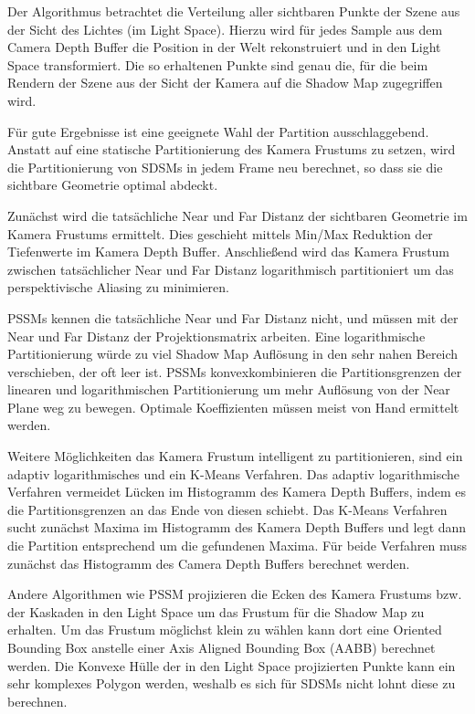 \documentclass[runningheaders,a4paper]{llncs}
\begin{document}
Der Algorithmus betrachtet die Verteilung aller sichtbaren Punkte der Szene aus der Sicht des Lichtes (im Light Space).
Hierzu wird für jedes Sample aus dem Camera Depth Buffer die Position in der Welt rekonstruiert und in den Light Space transformiert.
Die so erhaltenen Punkte sind genau die, für die beim Rendern der Szene aus der Sicht der Kamera auf die Shadow Map zugegriffen wird.


Für gute Ergebnisse ist eine geeignete Wahl der Partition ausschlaggebend.
Anstatt auf eine statische Partitionierung des Kamera Frustums \cite{pssm} zu setzen, wird die Partitionierung von SDSMs in jedem Frame neu berechnet, so dass sie die sichtbare Geometrie optimal abdeckt.

Zunächst wird die tatsächliche Near und Far Distanz der sichtbaren Geometrie im Kamera Frustums ermittelt.
Dies geschieht mittels Min/Max Reduktion der Tiefenwerte im Kamera Depth Buffer.
Anschließend wird das Kamera Frustum zwischen tatsächlicher Near und Far Distanz logarithmisch partitioniert um das perspektivische Aliasing zu minimieren.

PSSMs kennen die tatsächliche Near und Far Distanz nicht, und müssen mit der Near und Far Distanz der Projektionsmatrix arbeiten.
Eine logarithmische Partitionierung würde zu viel Shadow Map Auflösung in den sehr nahen Bereich verschieben, der oft leer ist.
PSSMs konvexkombinieren die Partitionsgrenzen der linearen und logarithmischen Partitionierung um mehr Auflösung von der Near Plane weg zu bewegen.
Optimale Koeffizienten müssen meist von Hand ermittelt werden.

Weitere Möglichkeiten das Kamera Frustum intelligent zu partitionieren, sind ein adaptiv logarithmisches und ein K-Means Verfahren.
Das adaptiv logarithmische Verfahren vermeidet Lücken im Histogramm des Kamera Depth Buffers, indem es die Partitionsgrenzen an das Ende von diesen schiebt.
Das K-Means Verfahren sucht zunächst Maxima im Histogramm des Kamera Depth Buffers und legt dann die Partition entsprechend um die gefundenen Maxima.
Für beide Verfahren muss zunächst das Histogramm des Camera Depth Buffers berechnet werden.


Andere Algorithmen wie PSSM \cite{pssm} projizieren die Ecken des Kamera Frustums bzw. der Kaskaden in den Light Space um das Frustum für die Shadow Map zu erhalten.
Um das Frustum möglichst klein zu wählen kann dort eine Oriented Bounding Box anstelle einer Axis Aligned Bounding Box (AABB) berechnet werden.
Die Konvexe Hülle der in den Light Space projizierten Punkte kann ein sehr komplexes Polygon werden, weshalb es sich für SDSMs nicht lohnt diese zu berechnen.
\end{document}
